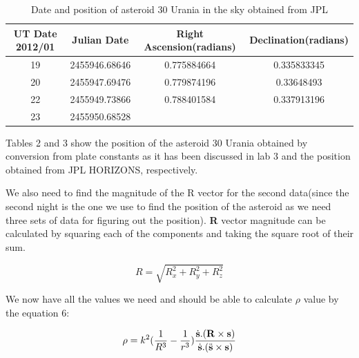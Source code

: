 \documentclass[letterpaper,12pt]{article}
\begin{document}
\FloatBarrier
\begin{table}[h!]
\caption{Date and position of asteroid 30 Urania in the sky obtained from JPL} %
\centering %
\begin{tabular}{| c | c | c | c |} %
\hline %
UT Date 2012/01 & Julian Date & Right Ascension(radians) & Declination(radians) \\ [0.5ex] %
\hline %
19   &   2455946.68646  & 0.775884664&   0.335833345 \\ \hline
20   &   2455947.69476  & 0.779874196  & 0.33648493   \\ \hline
22   &   2455949.73866 &  0.788401584 & 0.337913196    \\  \hline
23   &   2455950.68528  &  &     \\ [1ex] %
\hline %
\end{tabular}
\label{table:nonlin} %
\end{table}
\FloatBarrier

Tables 2 and 3 show the position of the asteroid 30 Urania obtained by conversion from plate constants as it has been discussed in lab 3 and the position obtained from JPL HORIZONS, respectively.

We also need to find the magnitude of the R vector for the second data(since the second night is the one we use to find the position of the asteroid as we need three sets of data for figuring out the position). {\bf R} vector magnitude can be calculated by squaring each of the components and taking the square root of their sum.

\begin{equation}
R=\sqrt{R_{x}^2+R_{y}^2+R_{z}^2}
\end{equation}


We now have all the values we need and should be able to calculate \begin{math} \rho \end{math} value by the equation 6:

\begin{equation}
\rho=k^2(\frac{1}{R^3}-\frac{1}{r^3})\frac{\dot{{\bf s}}.({\bf R}\times{\bf s})}{\dot{{\bf s}}.(\ddot{{\bf s}}\times{\bf s})}
\end{equation}
\end{document}
